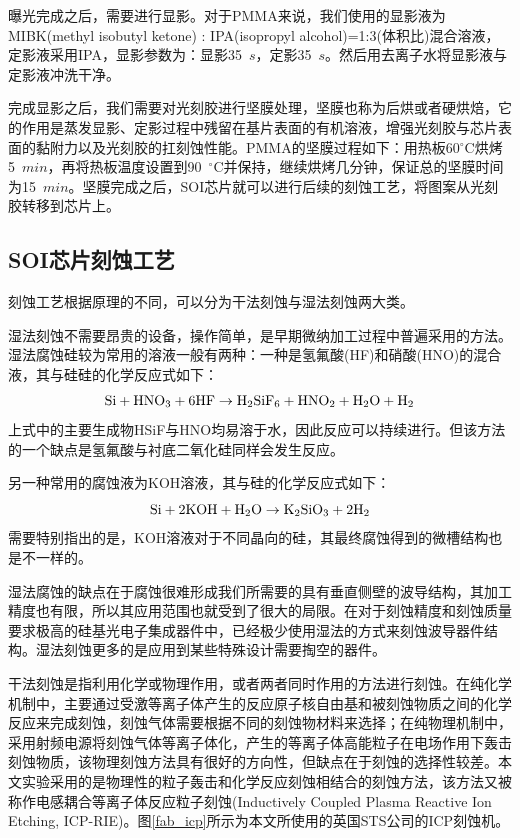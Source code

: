 曝光完成之后，需要进行显影。对于PMMA来说，我们使用的显影液为MIBK(methyl isobutyl ketone) : IPA(isopropyl alcohol)=1:3(体积比)混合溶液，定影液采用IPA，显影参数为：显影35~$s$，定影35~$s$。然后用去离子水将显影液与定影液冲洗干净。

完成显影之后，我们需要对光刻胶进行坚膜处理，坚膜也称为后烘或者硬烘焙，它的作用是蒸发显影、定影过程中残留在基片表面的有机溶液，增强光刻胶与芯片表面的黏附力以及光刻胶的扛刻蚀性能。PMMA的坚膜过程如下：用热板60$^{\circ}$C烘烤5~$min$，再将热板温度设置到90~$^{\circ}$C并保持，继续烘烤几分钟，保证总的坚膜时间为15~$min$。坚膜完成之后，SOI芯片就可以进行后续的刻蚀工艺，将图案从光刻胶转移到芯片上。

\subsection{SOI芯片刻蚀工艺}

刻蚀工艺根据原理的不同，可以分为干法刻蚀与湿法刻蚀两大类。

湿法刻蚀不需要昂贵的设备，操作简单，是早期微纳加工过程中普遍采用的方法。湿法腐蚀硅较为常用的溶液一般有两种：一种是氢氟酸(HF)和硝酸(HNO)的混合液，其与硅硅的化学反应式如下：
\begin{equation}
\rm Si+HNO_3+6HF\rightarrow H_2SiF_6+HNO_2+H_2O+H_2
\end{equation}
上式中的主要生成物HSiF与HNO均易溶于水，因此反应可以持续进行。但该方法的一个缺点是氢氟酸与衬底二氧化硅同样会发生反应。

另一种常用的腐蚀液为KOH溶液，其与硅的化学反应式如下：
\begin{equation}
\rm Si+2KOH+H_2O\rightarrow K_2SiO_3+2H_2
\end{equation}
需要特别指出的是，KOH溶液对于不同晶向的硅，其最终腐蚀得到的微槽结构也是不一样的。

湿法腐蚀的缺点在于腐蚀很难形成我们所需要的具有垂直侧壁的波导结构，其加工精度也有限，所以其应用范围也就受到了很大的局限。在对于刻蚀精度和刻蚀质量要求极高的硅基光电子集成器件中，已经极少使用湿法的方式来刻蚀波导器件结构。湿法刻蚀更多的是应用到某些特殊设计需要掏空的器件\cite{liu2016silicon}。

干法刻蚀是指利用化学或物理作用，或者两者同时作用的方法进行刻蚀。在纯化学机制中，主要通过受激等离子体产生的反应原子核自由基和被刻蚀物质之间的化学反应来完成刻蚀，刻蚀气体需要根据不同的刻蚀物材料来选择；在纯物理机制中，采用射频电源将刻蚀气体等离子体化，产生的等离子体高能粒子在电场作用下轰击刻蚀物质，该物理刻蚀方法具有很好的方向性，但缺点在于刻蚀的选择性较差。本文实验采用的是物理性的粒子轰击和化学反应刻蚀相结合的刻蚀方法，该方法又被称作电感耦合等离子体反应粒子刻蚀(Inductively Coupled Plasma Reactive Ion Etching, ICP-RIE)。图\ref{fab_icp}所示为本文所使用的英国STS公司的ICP刻蚀机。

